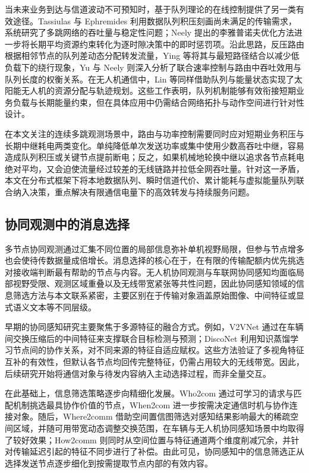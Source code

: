 当未来业务到达与信道波动不可预知时，基于队列理论的在线控制提供了另一类有效途径。Tassiulas 与 Ephremides 利用数据队列积压刻画尚未满足的传输需求，系统研究了多跳网络的吞吐量与稳定性问题\cite{tassiulas1992stability}；Neely 提出的李雅普诺夫优化方法进一步将长期平均资源约束转化为逐时隙决策中的即时惩罚项\cite{neely2010stochastic}。沿此思路，反压路由根据相邻节点的队列差动态分配转发流量，Ying 等将其与最短路径结合以减少低负载下的绕行现象\cite{related2}，Yu 与 Neely 则深入分析了联合速率控制与路由中吞吐效用与队列长度的权衡关系\cite{algo1}。在无人机通信中，Lin 等同样借助队列与能量状态实现了太阳能无人机的资源分配与轨迹规划\cite{intro2}。这些工作表明，队列机制能够有效衔接短期业务负载与长期能量约束，但在具体应用中仍需结合网络拓扑与动作空间进行针对性设计。

在本文关注的连续多跳观测场景中，路由与功率控制需要同时应对短期业务积压与长期中继耗电两类变化。单纯降低单次发送功率或集中使用少数高吞吐中继，容易造成队列积压或关键节点提前断电；反之，如果机械地轮换中继以追求各节点耗电绝对平均，又会迫使流量经过较差的无线链路并拉低全网吞吐量。针对这一矛盾，本文在分布式框架下将本地数据队列、瞬时信道代价、累计能耗与虚拟能量队列联合纳入决策，重点解决有限通信电量下的高效转发与持续服务问题。

\subsection{协同观测中的消息选择}

多节点协同观测通过汇集不同位置的局部信息弥补单机视野局限，但参与节点增多也会使待传数据量成倍增长。消息选择的核心在于，在有限的传输配额内优先挑选对接收端判断最有帮助的节点与内容。无人机协同观测与车联网协同感知均面临局部视野受限、观测区域重叠以及无线带宽紧张等共性问题，因此协同感知领域的信息筛选方法与本文联系紧密，主要区别在于传输对象涵盖原始图像、中间特征或显式语义文本等不同层级。

早期的协同感知研究主要聚焦于多源特征的融合方式。例如，V2VNet 通过在车辆间交换压缩后的中间特征来支撑联合目标检测与预测\cite{v2vnet}；DiscoNet 利用知识蒸馏学习节点间的协作关系，对不同来源的特征自适应赋权\cite{disconet}。这些方法验证了多视角特征互补的有效性，但默认各节点均回传完整特征，仍需占用较大的无线带宽。因此，后续研究开始将通信对象与待发内容纳入主动选择过程，而非全量交互。

在此基础上，信息筛选策略逐步向精细化发展。Who2com 通过可学习的请求与匹配机制挑选最具协作价值的节点\cite{who2com}，When2com 进一步按需决定通信时机与协作连接对象\cite{when2com}。随后，Where2comm 借助空间置信图筛选对感知结果影响最大的稀疏空间区域，并随可用带宽动态调整交换范围，在车辆与无人机协同感知场景中均取得了较好效果\cite{where2comm}；How2comm 则同时从空间位置与特征通道两个维度削减冗余，并针对传输延迟引起的特征不同步进行了补偿\cite{how2comm}。由此可见，协同感知中的信息筛选正从选择发送节点逐步细化到按需提取节点内部的有效内容。

